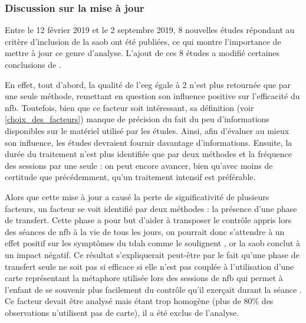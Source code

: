 \subsubsection{Discussion sur la mise à jour}

Entre le 12 février 2019 et le 2 septembre 2019, 8 nouvelles études répondant au critère d'inclusion de la \gls{saob} ont été publiées, ce qui montre l'importance de mettre à jour ce 
genre d'analyse. L'ajout de ces 8 études a modifié certaines conclusions de \citet{Bussalb2019a}. 

En effet, tout d'abord, la qualité de l'\gls{eeg} égale à 2 n'est plus retournée que par une seule méthode,
remettant en question son influence positive sur l'efficacité du \gls{nfb}. Toutefois, bien que ce facteur soit intéressant, sa définition (voir \ref{choix_des_facteurs}) manque de précision 
du fait du peu d'informations disponibles sur le matériel utilisé par les études. Ainsi, afin d'évaluer au mieux son influence, les études devraient fournir davantage d'informations. Ensuite, 
la durée du traitement n'est plus identifiée que par deux méthodes et la fréquence des sessions par une seule : on peut encore avancer, bien qu'avec moins de certitude que précédemment, 
qu'un traitement intensif est préférable. 

Alors que cette mise à jour a causé la perte de significativité de plusieurs facteurs, un facteur se voit identifié par deux méthodes : la présence d'une phase de transfert. 
Cette phase a pour but d'aider à transposer le contrôle appris lors des séances de \gls{nfb} à la vie de tous les jours, on pourrait donc s'attendre à un effet positif sur les symptômes
du \gls{tdah} comme le soulignent \citet{Arns2014, Strehl2006, Gani2008}, or la \gls{saob} conclut à un impact négatif. Ce résultat s'expliquerait peut-être par le fait qu'une phase de 
transfert seule ne soit pas si efficace si elle n'est pas couplée à l'utilisation d'une carte représentant la métaphore utilisée lors des sessions de \gls{nfb} qui permet à l'enfant de se 
souvenir plus facilement du contrôle qu'il exerçait durant la séance \citep{Bioulac2019, Bluschke2016}. Ce facteur devait être analysé mais étant trop homogène (plus de 80\% des observations n'utilisent pas de carte), il 
a été exclus de l'analyse. 

